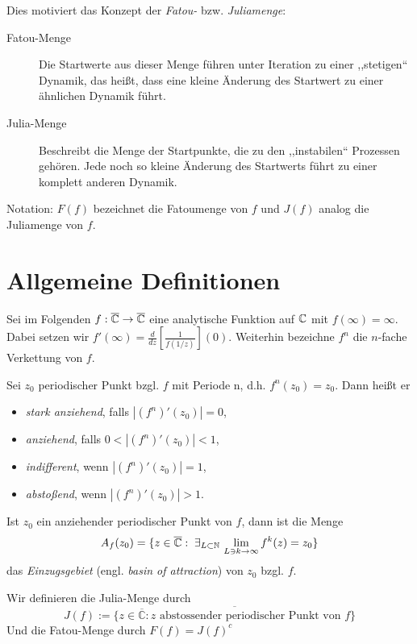 \documentclass{mywork}
\begin{document}
Dies motiviert das Konzept der \emph{Fatou-} bzw. \emph{Juliamenge}:
\begin{description}
\item[Fatou-Menge] Die Startwerte aus dieser Menge führen unter Iteration zu einer ,,stetigen`` Dynamik, das heißt, dass eine kleine Änderung des Startwert zu einer ähnlichen Dynamik führt.
\item[Julia-Menge] Beschreibt die Menge der Startpunkte, die zu den ,,instabilen`` Prozessen gehören. Jede noch so kleine Änderung des Startwerts führt zu einer komplett anderen Dynamik.
\end{description} 
Notation: $F(f)$ bezeichnet die Fatoumenge von $f$ und $J(f)$ analog die Juliamenge von $f$.


\section{Allgemeine Definitionen}

Sei im Folgenden $f: \overline{\mathbb{C}} \to \overline{\mathbb{C}}$ eine analytische Funktion auf $\mathbb{C}$ mit $f(\infty)=\infty$. Dabei setzen wir $f'(\infty)=\frac{d}{d z} \left [\frac{1}{f(1/z)} \right ](0)$. Weiterhin bezeichne $f^n$ die $n$-fache Verkettung von $f$.

\begin{df} \label{1}
Sei $z_0$ periodischer Punkt bzgl. $f$ mit Periode n, d.h. $f^n(z_0)=z_0$. Dann heißt er
\begin{itemize}
\item \emph{stark anziehend}, falls $|(f^n)'(z_0)|=0$,
\item \emph{anziehend}, falls $0<|(f^n)'(z_0)|<1$,
\item \emph{indifferent}, wenn $|(f^n)'(z_0)|=1$,
\item \emph{abstoßend}, wenn $|(f^n)'(z_0)|>1$.
\end{itemize} 
\end{df}


\begin{df}[Einzugsgebiet] \label{2}
Ist $z_0$ ein anziehender periodischer Punkt von $f$, dann ist die Menge
\[
	A_f(z_0)=\{z\in \overline{\mathbb{C}}: \exists_{L\subset \N} \, \lim\limits_{L\ni k\to \infty} f^{k}(z)=z_0\}
\]
das \emph{Einzugsgebiet} (engl. \emph{basin of attraction}) von $z_0$ bzgl. $f$.
\end{df}

\begin{df} \label{3}
Wir definieren die Julia-Menge durch
\[
J(f):=\overline{\{z\in \overline{\mathbb{C}}: z \text{ abstossender periodischer Punkt von $f$} \}}
\]
Und die Fatou-Menge durch $F(f)=J(f)^c$
\end{df}
\end{document}
